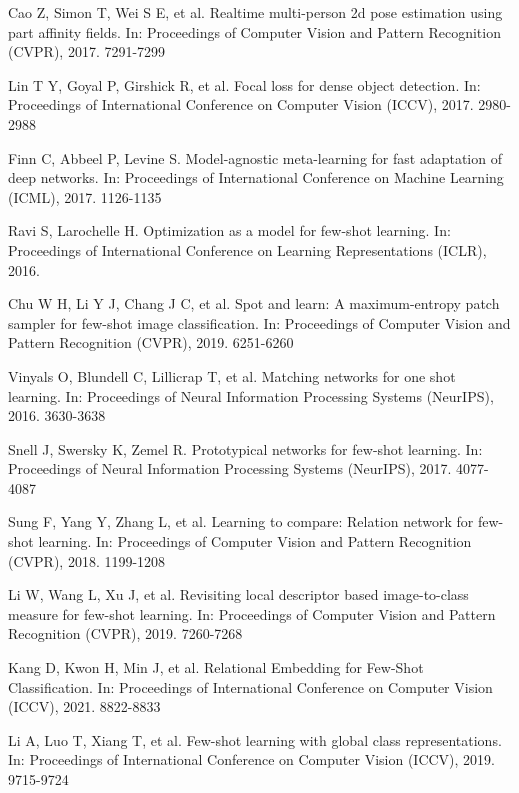\documentclass{SCIS2019}
\begin{document}
\begin{thebibliography}{99}
	
	 Cao Z, Simon T, Wei S E, et al. Realtime multi-person 2d pose estimation using part affinity fields. In: Proceedings of Computer Vision and Pattern Recognition (CVPR), 2017. 7291-7299
	
	 Lin T Y, Goyal P, Girshick R, et al. Focal loss for dense object detection. In: Proceedings of International Conference on Computer Vision (ICCV), 2017. 2980-2988
	
	 Finn C, Abbeel P, Levine S. Model-agnostic meta-learning for fast adaptation of deep networks. In: Proceedings of International Conference on Machine Learning (ICML), 2017. 1126-1135
		
	 Ravi S, Larochelle H. Optimization as a model for few-shot learning. In: Proceedings of International Conference on Learning Representations (ICLR), 2016.
		
	 Chu W H, Li Y J, Chang J C, et al. Spot and learn: A maximum-entropy patch sampler for few-shot image classification. In: Proceedings of Computer Vision and Pattern Recognition (CVPR), 2019. 6251-6260
		
	 Vinyals O, Blundell C, Lillicrap T, et al. Matching networks for one shot learning. In: Proceedings of Neural Information Processing Systems (NeurIPS), 2016. 3630-3638
		
	 Snell J, Swersky K, Zemel R. Prototypical networks for few-shot learning. In: Proceedings of Neural Information Processing Systems (NeurIPS), 2017. 4077-4087
		
	 Sung F, Yang Y, Zhang L, et al. Learning to compare: Relation network for few-shot learning. In: Proceedings of Computer Vision and Pattern Recognition (CVPR), 2018. 1199-1208
		
	 Li W, Wang L, Xu J, et al. Revisiting local descriptor based image-to-class measure for few-shot learning. In: Proceedings of Computer Vision and Pattern Recognition (CVPR), 2019. 7260-7268
		
	 Kang D, Kwon H, Min J, et al. Relational Embedding for Few-Shot Classification. In: Proceedings of International Conference on Computer Vision (ICCV), 2021. 8822-8833
	
	 Li A, Luo T, Xiang T, et al. Few-shot learning with global class representations. In: Proceedings of International Conference on Computer Vision (ICCV), 2019. 9715-9724
	

\end{thebibliography}
\end{document}
